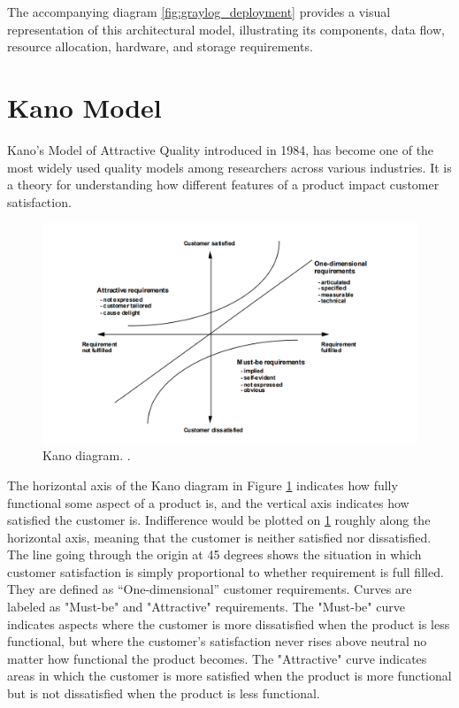 \documentclass[../main.tex]{subfiles}
\begin{document}
The accompanying diagram \ref{fig:graylog_deployment} provides a visual representation of this architectural model, illustrating its components, data flow, resource allocation, hardware, and storage requirements.

\section{Kano Model}

Kano’s Model of Attractive Quality \cite{kano1984attractive} introduced in 1984, has become one of the most widely used quality models among researchers across various industries. It is a theory for understanding how different features of a product impact customer satisfaction. 

\begin{figure}[H]
        \centering
        \includegraphics[scale=0.9]{img/3-background/kano/kano.png}
        \caption{Kano diagram. \cite{kanomodel1996}.}
        \label{fig:kano}
\end{figure}

The horizontal axis of the Kano diagram in Figure \ref{fig:kano} indicates how fully functional some aspect of a product is, and the vertical axis indicates how satisfied the customer is. Indifference would be plotted on \ref{fig:kano} roughly along the horizontal axis, meaning that the customer is neither satisfied nor dissatisfied. The line going through the origin at 45 degrees shows the situation in which customer satisfaction is simply proportional to whether requirement is full filled. They are defined as “One-dimensional” customer requirements. Curves are labeled as "Must-be" and "Attractive" requirements. The "Must-be" curve indicates aspects where the customer is more dissatisfied when the product is less functional, but where the customer’s satisfaction never rises above neutral no matter how functional the product becomes. The "Attractive" curve indicates areas in which 
the customer is more satisfied when the product is more functional but is not dissatisfied when the product is less functional. \cite{berger1993kano}
\end{document}
